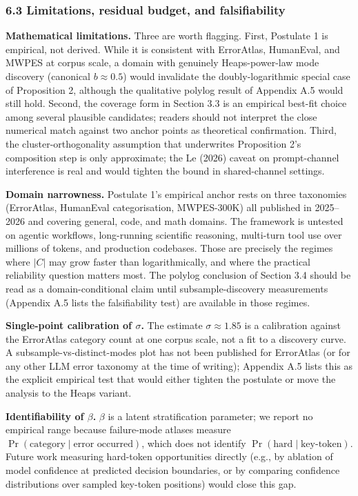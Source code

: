 \documentclass[
]{article}
\begin{document}
\subsubsection{6.3 Limitations, residual budget, and
falsifiability}\label{limitations-residual-budget-and-falsifiability}

\textbf{Mathematical limitations.} Three are worth flagging. First,
Postulate 1 is empirical, not derived. While it is consistent with
ErrorAtlas, HumanEval, and MWPES at corpus scale, a domain with
genuinely Heaps-power-law mode discovery (canonical \(b \approx 0.5\))
would invalidate the doubly-logarithmic special case of Proposition 2,
although the qualitative polylog result of Appendix A.5 would still
hold. Second, the coverage form in Section 3.3 is an empirical best-fit
choice among several plausible candidates; readers should not interpret
the close numerical match against two anchor points as theoretical
confirmation. Third, the cluster-orthogonality assumption that
underwrites Proposition 2's composition step is only approximate; the Le
(2026) caveat on prompt-channel interference is real and would tighten
the bound in shared-channel settings.

\textbf{Domain narrowness.} Postulate 1's empirical anchor rests on
three taxonomies (ErrorAtlas, HumanEval categorisation, MWPES-300K) all
published in 2025--2026 and covering general, code, and math domains.
The framework is untested on agentic workflows, long-running scientific
reasoning, multi-turn tool use over millions of tokens, and production
codebases. Those are precisely the regimes where \(|C|\) may grow faster
than logarithmically, and where the practical reliability question
matters most. The polylog conclusion of Section 3.4 should be read as a
domain-conditional claim until subsample-discovery measurements
(Appendix A.5 lists the falsifiability test) are available in those
regimes.

\textbf{Single-point calibration of \(\sigma\).} The estimate
\(\sigma \approx 1.85\) is a calibration against the ErrorAtlas category
count at one corpus scale, not a fit to a discovery curve. A
subsample-vs-distinct-modes plot has not been published for ErrorAtlas
(or for any other LLM error taxonomy at the time of writing); Appendix
A.5 lists this as the explicit empirical test that would either tighten
the postulate or move the analysis to the Heaps variant.

\textbf{Identifiability of \(\beta\).} \(\beta\) is a latent
stratification parameter; we report no empirical range because
failure-mode atlases measure
\(\Pr(\text{category} \mid \text{error occurred})\), which does not
identify \(\Pr(\text{hard} \mid \text{key-token})\). Future work
measuring hard-token opportunities directly (e.g., by ablation of model
confidence at predicted decision boundaries, or by comparing confidence
distributions over sampled key-token positions) would close this gap.
\end{document}
